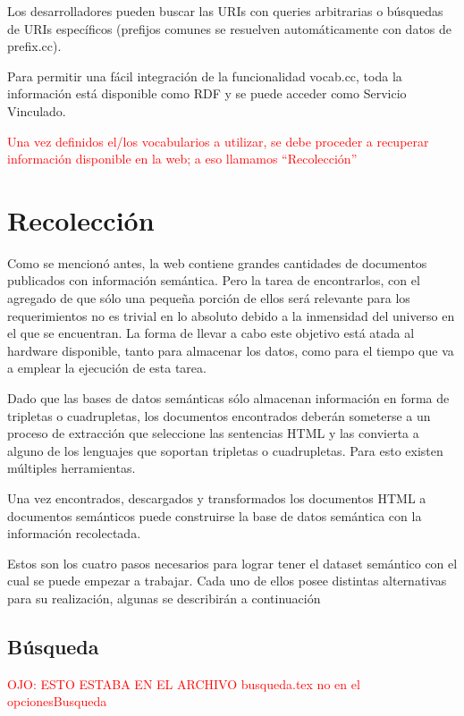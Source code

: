Los desarrolladores pueden buscar las URIs con queries arbitrarias o búsquedas de URIs específicos (prefijos comunes se resuelven automáticamente con datos de prefix.cc).

Para permitir una fácil integración de la funcionalidad vocab.cc, toda la información está disponible como RDF y se puede acceder como Servicio Vinculado.

\begin{framed}
\textcolor{red}{Una vez definidos el/los vocabularios a utilizar, se debe proceder a recuperar información disponible en la web; a eso llamamos ``Recolección''}
\end{framed}

\section{Recolección}

%
Como se mencionó antes, la web contiene grandes cantidades de documentos publicados con información semántica. Pero la tarea
de encontrarlos, con el agregado de que sólo una pequeña porción de ellos será relevante para los requerimientos no es trivial
en lo absoluto debido a la inmensidad del universo en el que se encuentran. La forma de llevar a cabo este objetivo está 
atada al hardware disponible, tanto para almacenar los datos, como para el tiempo que va a emplear la ejecución de esta 
tarea.  

Dado que las bases de datos semánticas sólo almacenan información en forma de tripletas o cuadrupletas, los documentos encontrados 
deberán someterse a un proceso de extracción que seleccione las sentencias HTML y las convierta a alguno de los lenguajes que soportan  
tripletas o cuadrupletas. Para esto existen múltiples herramientas. 

Una vez encontrados, descargados y transformados los documentos HTML a documentos semánticos puede construirse la base de datos semántica 
con la información recolectada. 

Estos son los cuatro pasos necesarios para lograr tener el dataset semántico con el cual se puede empezar a trabajar. Cada uno de ellos 
posee distintas alternativas para su realización, algunas se describirán a continuación 



\subsection{Búsqueda}
%
\textcolor{red}{OJO: ESTO ESTABA EN EL ARCHIVO busqueda.tex no en el opcionesBusqueda}


